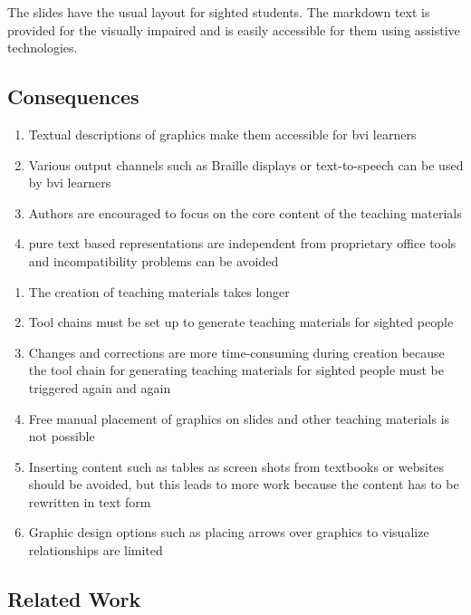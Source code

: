 The slides have the usual layout for sighted students.  
The markdown text is provided for the visually impaired and is easily accessible for them using assistive technologies. 


\subsection*{Consequences}



\renewcommand{\labelenumi}{$+$}
\begin{enumerate}
   \item Textual descriptions of graphics make them accessible for \ac{bvi} learners
\item Various output channels such as Braille displays or text-to-speech can be used by \ac{bvi} learners
\item Authors are encouraged to focus on the core content of the teaching materials
\item pure text based representations are independent from proprietary office tools and incompatibility problems can be avoided 
 
\end{enumerate}

\renewcommand{\labelenumi}{$-$}
\begin{enumerate}
\item The creation of teaching materials takes longer
    \item Tool chains must be set up to generate teaching materials for sighted people
\item Changes and corrections are more time-consuming during creation because the tool chain for generating teaching materials for sighted people must be triggered again and again
\item Free manual placement of graphics on slides and other teaching materials is not possible
    \item Inserting content such as tables as screen shots from textbooks or websites should be avoided, but this leads to more work because the content has to be rewritten in text form
\item Graphic design options such as placing arrows over graphics to visualize relationships are limited
\end{enumerate}
 
\subsection*{Related Work}

